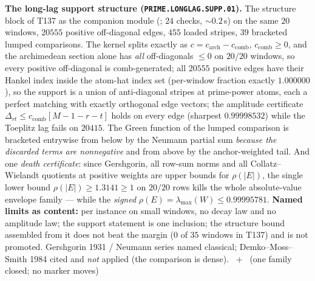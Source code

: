 \documentclass[11pt,a4paper]{article}
\theoremstyle{definition}
\begin{document}
\par\smallskip\noindent\textbf{The long-lag support structure
(\texttt{PRIME.LONGLAG.SUPP.01}).}
The structure block of T137 as the companion module
(; $24$ checks, ${\sim}0.2$\,s) on the same $20$
windows, $20555$ positive off-diagonal edges, $455$ loaded stripes, $39$
bracketed lumped comparisons. The kernel splits exactly as
$c=c_{\mathrm{arch}}-c_{\mathrm{comb}}$, $c_{\mathrm{comb}}\ge0$, and the
archimedean section alone has \emph{all} off-diagonals $\le0$ on $20/20$ windows,
so every positive off-diagonal is comb-generated; all $20555$ positive edges have
their Hankel index inside the atom-hat index set (per-window fraction exactly
$1.000000$), so the support is a union of anti-diagonal stripes at prime-power
atoms, each a perfect matching with exactly orthogonal edge vectors; the
amplitude certificate $\Delta_{rt}\le c_{\mathrm{comb}}[M-1-r-t]$ holds on every
edge (sharpest $0.99998532$) while the Toeplitz lag fails on $20415$. The Green
function of the lumped comparison is bracketed entrywise from below by the
Neumann partial sum \emph{because the discarded terms are nonnegative} and from
above by the anchor-weighted tail. And one \emph{death certificate}: since
Gershgorin, all row-sum norms and all Collatz--Wielandt quotients at positive
weights are upper bounds for $\rho(|E|)$, the single lower bound
$\rho(|E|)\ge1.3141\ge1$ on $20/20$ rows kills the whole absolute-value envelope
family --- while the \emph{signed} $\rho(E)=\lambda_{\max}(W)\le0.99995781$.
\textbf{Named limits as content:} per instance on small windows, no decay law and
no amplitude law; the support statement is one inclusion; the structure bound
assembled from it does not beat the margin ($0$ of $35$ windows in T137) and is
not promoted. Gershgorin 1931 / Neumann series named classical;
Demko--Moss--Smith 1984 cited and \emph{not} applied (the comparison is dense).
\mE\ $+$ \mX\ (one family closed; no marker moves)
\par\smallskip
\end{document}
